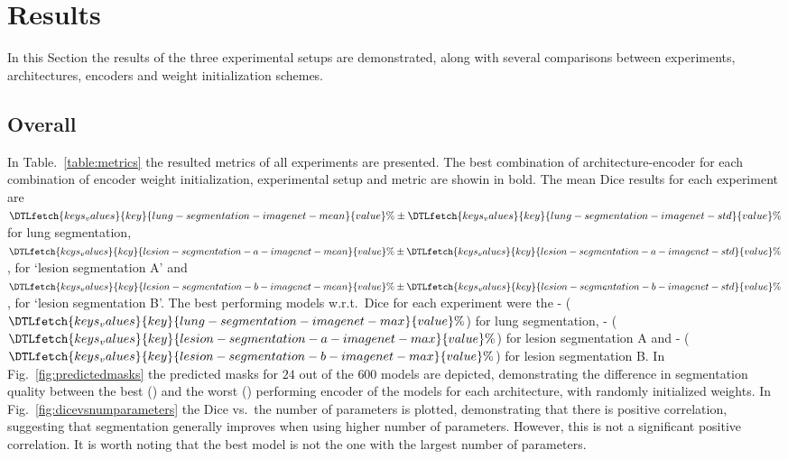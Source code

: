 \documentclass{elsarticle}
\begin{document}
\section{Results}
\label{sec:results}
In this Section the results of the three experimental setups are demonstrated, along with several comparisons between experiments, architectures, encoders and weight initialization schemes.

\subsection{Overall}
In Table.~\ref{table:metrics} the resulted metrics of all experiments are presented.
The best combination of architecture-encoder for each combination of encoder weight initialization, experimental setup and metric are showin in bold.
The mean Dice results for each experiment are $\DTLfetch{keys_values}{key}{lung-segmentation-imagenet-mean}{value}\%\pm\DTLfetch{keys_values}{key}{lung-segmentation-imagenet-std}{value}\%$ for lung segmentation, $\DTLfetch{keys_values}{key}{lesion-segmentation-a-imagenet-mean}{value}\%\pm\DTLfetch{keys_values}{key}{lesion-segmentation-a-imagenet-std}{value}\%$, for `lesion segmentation A' and $\DTLfetch{keys_values}{key}{lesion-segmentation-b-imagenet-mean}{value}\%\pm\DTLfetch{keys_values}{key}{lesion-segmentation-b-imagenet-std}{value}\%$, for `lesion segmentation B'.
The best performing models w.r.t.\ Dice for each experiment were the - ($\DTLfetch{keys_values}{key}{lung-segmentation-imagenet-max}{value}\%$) for lung segmentation, - ($\DTLfetch{keys_values}{key}{lesion-segmentation-a-imagenet-max}{value}\%$) for lesion segmentation A and - ($\DTLfetch{keys_values}{key}{lesion-segmentation-b-imagenet-max}{value}\%$) for lesion segmentation B.
In Fig.~\ref{fig:predictedmasks} the predicted masks for $24$ out of the $600$ models are depicted, demonstrating the difference in segmentation quality between the best () and the worst () performing encoder of the models for each architecture, with randomly initialized weights.
In Fig.~\ref{fig:dicevsnumparameters} the Dice vs.\ the number of parameters is plotted, demonstrating that there is positive correlation, suggesting that segmentation generally improves when using higher number of parameters.
However, this is not a significant positive correlation.
It is worth noting that the best model is not the one with the largest number of parameters.
\end{document}
